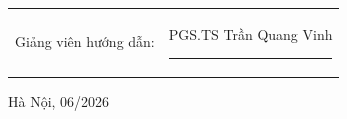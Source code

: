 \documentclass[DoAn.tex]{subfiles}
\begin{document}
\begin{titlepage}
\begin{center}
\begin{table}[H]
    \centering
    \begin{tabular}{l l}
        \fontsize{14pt}{0pt}\selectfont Giảng viên hướng dẫn: & \fontsize{14pt}{0pt}\selectfont PGS.TS Trần Quang Vinh \hspace{0.7cm} \rule{3cm}{0.1mm} \\[0.45cm]
    \end{tabular}
\end{table}

\fontsize{14pt}{0pt}\selectfont Hà Nội, 06/2026
\end{center}
\end{titlepage}
\end{document}
